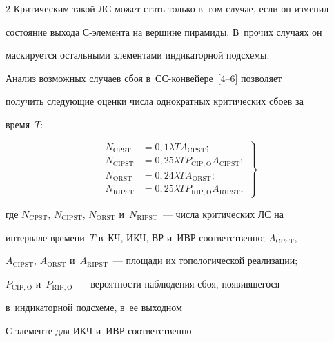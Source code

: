 \begin{multicols}{2}
Критическим такой ЛС может стать только в~том случае, если он изменил 

состояние выхода С-эле\-мен\-та на вершине пирамиды. В~прочих случаях он 

маскируется остальными элементами индикаторной подсхемы.

  

  Анализ возможных случаев сбоя в~СС-кон\-вей\-ере~[4--6] позволяет 

получить следующие оценки  числа однократных критических сбоев за 

время~$T$:



\noindent

  \begin{equation}

  \left.

  \begin{array}{rl}

     N_{\mathrm{CPST}} & = 0{,}1\lambda T A_{\mathrm{CPST}};\\[6pt]

     N_{\mathrm{CIPST}} &= 0{,}25\lambda TP_{\mathrm{CIP},\mathrm{O}} A_{\mathrm{CIPST}};\\[6pt]

 N_{\mathrm{ORST}} & = 0{,}24\lambda TA_{\mathrm{ORST}};\\[6pt]

N_{\mathrm{RIPST}}  &= 0{,}25\lambda TP_{\mathrm{RIP,O}}A_{\mathrm{RIPST}},

\end{array}

\right\}

\label{e1-sok}

\end{equation}

где $N_{\mathrm{CPST}}$, $N_{\mathrm{CIPST}}$, $N_{\mathrm{ORST}}$ и~$N_{\mathrm{RIPST}}$~--- числа критических ЛС на 

интервале времени~$T$ в~КЧ, ИКЧ, ВР и~ИВР соответственно; $A_{\mathrm{CPST}}$, 

$A_{\mathrm{CIPST}}$, $A_{\mathrm{ORST}}$ и~$A_{\mathrm{RIPST}}$~--- площади их топологической реализации; 

$P_{\mathrm{CIP,O}}$ и~$P_{\mathrm{RIP,O}}$~--- вероятности наблюдения сбоя, появившегося 

в~индикаторной подсхеме, в~ее выходном  

С-эле\-мен\-те для ИКЧ и~ИВР соответственно. 




\end{multicols}

